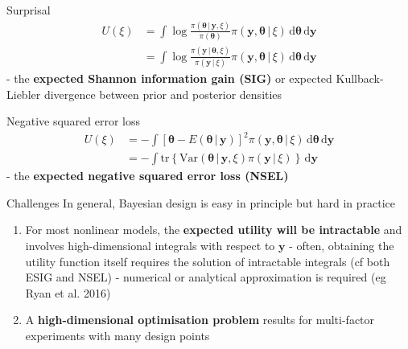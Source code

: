 \documentclass[
  ignorenonframetext,
]{beamer}
\begin{document}
\begin{frame}{}
\protect\hypertarget{section-30}{}
Surprisal \[
\begin{split}
U(\xi) & = \int \log \frac{\pi(\boldsymbol{\theta}\,|\,\boldsymbol{y},\xi)}{\pi(\boldsymbol{\theta})}\pi(\boldsymbol{y},\boldsymbol{\theta}\,|\,\xi)\,\mathrm{d}\boldsymbol{\theta}\,\mathrm{d}\boldsymbol{y}\\
& = \int \log \frac{\pi(\boldsymbol{y}\,|\,\boldsymbol{\theta},\xi)}{\pi(\boldsymbol{y}\,|\,\xi)}\pi(\boldsymbol{y},\boldsymbol{\theta}\,|\,\xi)\,\mathrm{d}\boldsymbol{\theta}\,\mathrm{d}\boldsymbol{y}
\end{split}
\] - the \textbf{expected Shannon information gain (SIG)} or expected
Kullback-Liebler divergence between prior and posterior densities

Negative squared error loss \[
\begin{split}
U(\xi) & = - \int \left[\boldsymbol{\theta}- E(\boldsymbol{\theta}\,|\,\boldsymbol{y})\right]^2\pi(\boldsymbol{y},\boldsymbol{\theta}\,|\,\xi)\,\mathrm{d}\boldsymbol{\theta}\,\mathrm{d}\boldsymbol{y}\\
& = - \int \mbox{tr}\left\{\mbox{Var}(\boldsymbol{\theta}\,|\,\boldsymbol{y},\xi)\pi(\boldsymbol{y}\,|\,\xi)\right\}\,\mathrm{d}\boldsymbol{y}
\end{split}
\] - the \textbf{expected negative squared error loss (NSEL)}
\end{frame}

\begin{frame}{Challenges}
\protect\hypertarget{challenges}{}
In general, Bayesian design is easy in principle but hard in practice

\begin{enumerate}
\item
  For most nonlinear models, the \textbf{expected utility will be
  intractable} and involves high-dimensional integrals with respect to
  \(\boldsymbol{y}\) - often, obtaining the utility function itself
  requires the solution of intractable integrals (cf both ESIG and NSEL)
  - numerical or analytical approximation is required (eg Ryan et al.
  2016)
\item
  A \textbf{high-dimensional optimisation problem} results for
  multi-factor experiments with many design points
\end{enumerate}
\end{frame}
\end{document}
